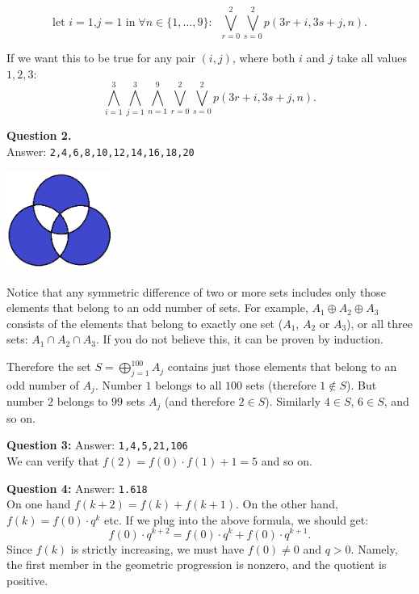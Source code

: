 \documentclass[jou]{apa6}
\begin{document}
{\small
$$\mbox{let $i=1$,$j=1$ in}\;\forall n\in \{1,\ldots,9 \}:\;\;
\bigvee\limits_{r = 0}^{2} \bigvee\limits_{s = 0}^{2} p(3r+i, 3s+j, n).$$
}

If we want this to be true for any pair $(i,j)$, where both $i$ and $j$ take
all values $1,2,3$:
$$\bigwedge\limits_{i = 1}^{3} \bigwedge\limits_{j = 1}^{3} \bigwedge\limits_{n = 1}^{9}
\bigvee\limits_{r = 0}^{2} \bigvee\limits_{s = 0}^{2} p(3r+i, 3s+j, n).$$

\vspace{6pt}
{\bf Question 2.}\\ Answer: {\tt 2,4,6,8,10,12,14,16,18,20}\\
\begin{center}
\includegraphics[width=1.4in]{symmetric-differences.png}
\end{center}
Notice that any symmetric difference of two or more sets
includes only those elements that belong to an odd number of sets. 
For example, $A_1 \oplus A_2 \oplus A_3$ consists of the elements
that belong to exactly one set ($A_1$, $A_2$ or $A_3$), or 
all three sets: $A_1 \cap A_2 \cap A_3$. 
If you do not believe this, it can be proven by induction. 

Therefore the set $S = \bigoplus\limits_{j=1}^{100} A_j$ contains just those
elements that belong to an odd number of $A_j$. Number $1$ belongs to all $100$ sets
(therefore $1 \not\in S$). But number $2$ belongs to $99$ sets $A_j$ 
(and therefore $2 \in S$). Similarly $4 \in S$, $6 \in S$, and so on. 




\vspace{6pt}
{\bf Question 3:} Answer: {\tt 1,4,5,21,106}\\
We can verify that $f(2) = f(0)\cdot f(1) + 1 = 5$ and so on.

\vspace{6pt}
{\bf Question 4:} Answer: {\tt 1.618}\\
On one hand $f(k+2) = f(k) + f(k+1)$. On the other hand, 
$f(k) = f(0)\cdot q^k$ etc. If we plug into the above formula, we should get:
\begin{equation}
\label{some}
f(0) \cdot q^{k+2} = f(0) \cdot q^k + f(0) \cdot q^{k+1}.
\end{equation}
Since $f(k)$ is strictly increasing, we must have $f(0) \neq 0$ and 
$q > 0$. Namely, the first member in the geometric progression is nonzero, 
and the quotient is positive. 
\end{document}
